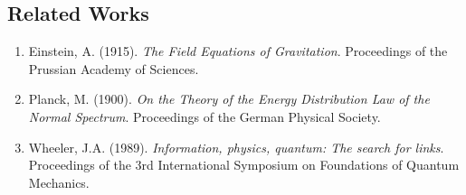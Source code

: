 \documentclass[12pt,a4paper]{article}
\begin{document}
	\subsection{Related Works}
	
	\begin{enumerate}
		\item Einstein, A. (1915). \textit{The Field Equations of Gravitation}. Proceedings of the Prussian Academy of Sciences.
		\item Planck, M. (1900). \textit{On the Theory of the Energy Distribution Law of the Normal Spectrum}. Proceedings of the German Physical Society.
		\item Wheeler, J.A. (1989). \textit{Information, physics, quantum: The search for links}. Proceedings of the 3rd International Symposium on Foundations of Quantum Mechanics.
	\end{enumerate}
	
\end{document}
